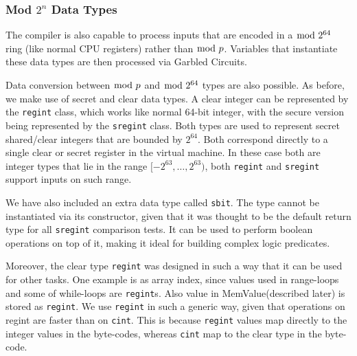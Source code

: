 \subsubsection{Mod $2^n$ Data Types}
\label{sec:mod2n}
The compiler is also capable to process inputs that are encoded in a $\bmod \; 2^{64}$  ring (like normal CPU registers) 
rather than $\bmod \; p$. 
Variables that instantiate these data types are then processed via Garbled Circuits. 

Data conversion between $\bmod \; p$ and $\bmod \; 2^{64}$ types are also possible. As before, we make use of secret and clear data types. A clear integer can be represented by the \verb|regint| class, which works like normal 64-bit integer,
with the secure version being represented by the \verb|sregint| class.
Both types are used to represent secret shared/clear integers that are bounded by $2^{64}$. 
Both correspond directly to a single clear or secret register in the virtual machine. 
In these case both are integer types that lie in the range $[-2^{63}, \dots, 2^{63})$, both \verb|regint| and \verb|sregint| support inputs on such  range.

We have also included an extra data type called \verb|sbit|. 
The type cannot be instantiated via its constructor, given that it was thought to be the default return 
type for all \verb|sregint| comparison tests. 
It can be used to perform boolean operations on top of it, making it ideal for building complex logic predicates.

Moreover, the clear type \verb|regint| was designed in such a way that it can be used for other tasks. 
One example is as array index, since values used in range-loops and some of while-loops are \verb|regint|s. 
Also value in MemValue(described later) is stored as \verb|regint|. 
We use \verb|regint| in such a generic way, given that operations on regint are faster than on \verb|cint|. 
This is because \verb+regint+ values map directly to the integer values in the byte-codes,
whereas \verb+cint+ map to the clear type in the byte-code.

